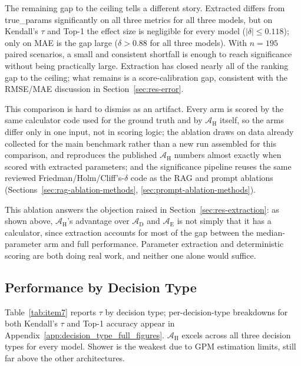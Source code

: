 \documentclass[final,3p,times]{elsarticle}
\begin{document}
The remaining gap to the ceiling tells a different story. Extracted differs from true\_params significantly on all three metrics for all three models, but on Kendall's $\tau$ and Top-1 the effect size is negligible for every model ($|\delta| \leq 0.118$); only on MAE is the gap large ($\delta > 0.88$ for all three models). With $n=195$ paired scenarios, a small and consistent shortfall is enough to reach significance without being practically large. Extraction has closed nearly all of the ranking gap to the ceiling; what remains is a score-calibration gap, consistent with the RMSE/MAE discussion in Section~\ref{sec:res-error}.

This comparison is hard to dismiss as an artifact. Every arm is scored by the same calculator code used for the ground truth and by $\mathcal{A}_{\text{H}}$ itself, so the arms differ only in one input, not in scoring logic; the ablation draws on data already collected for the main benchmark rather than a new run assembled for this comparison, and reproduces the published $\mathcal{A}_{\text{H}}$ numbers almost exactly when scored with extracted parameters; and the significance pipeline reuses the same reviewed Friedman/Holm/Cliff's-$\delta$ code as the RAG and prompt ablations (Sections~\ref{sec:rag-ablation-methods}, \ref{sec:prompt-ablation-methods}).

This ablation answers the objection raised in Section~\ref{sec:res-extraction}: as shown above, $\mathcal{A}_{\text{H}}$'s advantage over $\mathcal{A}_{\text{D}}$ and $\mathcal{A}_{\text{E}}$ is not simply that it has a calculator, since extraction accounts for most of the gap between the median-parameter arm and full performance. Parameter extraction and deterministic scoring are both doing real work, and neither one alone would suffice.

\FloatBarrier
\subsection{Performance by Decision Type}
\label{sec:res-bytype}
Table~\ref{tab:item7} reports $\tau$ by decision type; per-decision-type breakdowns for both Kendall's $\tau$ and Top-1 accuracy appear in Appendix~\ref{app:decision_type_full_figures}. $\mathcal{A}_{\text{H}}$ excels across all three decision types for every model. Shower is the weakest due to GPM estimation limits, still far above the other architectures.
\end{document}
